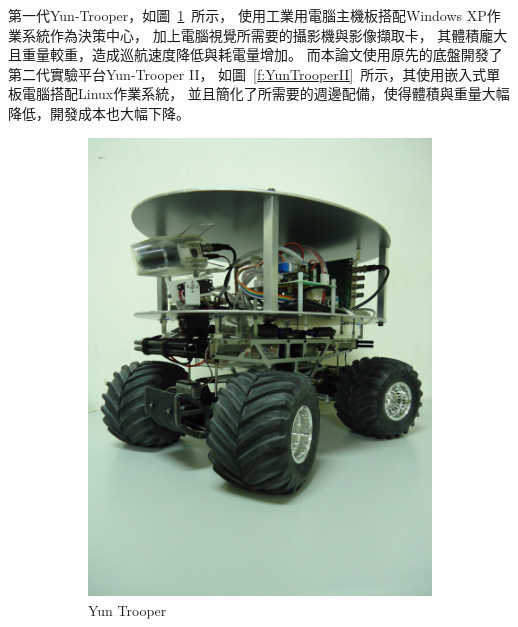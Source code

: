 第一代Yun-Trooper，如圖~\ref{f:YunTrooperI}~所示，
使用工業用電腦主機板搭配Windows XP作業系統作為決策中心，
加上電腦視覺所需要的攝影機與影像擷取卡，
其體積龐大且重量較重，造成巡航速度降低與耗電量增加。
而本論文使用原先的底盤開發了第二代實驗平台Yun-Trooper II，
如圖~\ref{f:YunTrooperII}~所示，其使用嵌入式單板電腦搭配Linux作業系統，
並且簡化了所需要的週邊配備，使得體積與重量大幅降低，開發成本也大幅下降。
\begin{figure}[h!]
	\centering
	\begin{subfigure}[b]{0.45\textwidth}
		\includegraphics[width=\textwidth]{figures/YunTrooper}
		\caption{Yun Trooper}
		\label{f:YunTrooperI}
	\end{subfigure}
	\begin{subfigure}[b]{0.45\textwidth}

\end{subfigure}
\end{figure}
